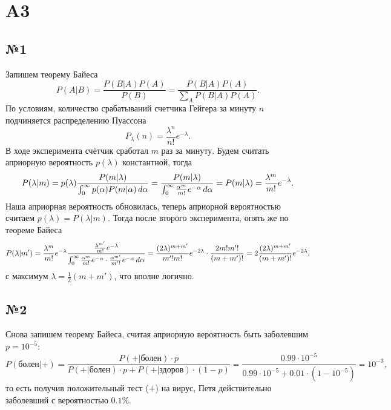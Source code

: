 \newpage

\section{A3}

\subsection*{№1}

Запишем теорему Байеса
\begin{equation*}
    P(A|B) = \frac{P(B|A) P(A)}{P(B)} = \frac{P(B|A) P(A)}{\sum_A P(B|A) P(A)}.
\end{equation*}
По условиям, количество срабатываний счетчика Гейгера за минуту $n$ подчиняется распределению Пуассона
\begin{equation*}
    P_\lambda (n) = \frac{\lambda^n}{n!} e^{-\lambda}.
\end{equation*}
В ходе эксперимента счётчик сработал $m$ раз за минуту. Будем считать априорную вероятность $p(\lambda)$ константной, тогда
\begin{equation*}
    P(\lambda|m) = p(\lambda) \frac{P(m|\lambda)}{\int_{0}^{\infty} p(\alpha) P(m|\alpha) \, d \alpha} = \frac{P(m|\lambda)}{\int_{0}^{\infty}  \frac{\alpha^m}{m!} e^{- \alpha} \, d \alpha} = P(m|\lambda) = \frac{\lambda^m}{m!} e^{- \lambda}.
\end{equation*}
Наша априорная вероятность обновилась, теперь априорной вероятностью считаем $p(\lambda) = P(\lambda|m)$. Тогда после второго эксперимента, опять же по теореме Байеса
\begin{equation*}
    P(\lambda|m') = \frac{\lambda^m}{m!} e^{- \lambda} 
    \frac{\frac{\lambda^{m'}}{m!}e^{-\lambda}}{\int_{0}^{\infty} \frac{\alpha^m}{m!} e^{-\alpha} \cdot \frac{\alpha^{m'}}{m'!} e^{-\alpha} \, d \alpha} = 
    \frac{(2 \lambda)^{m + m'}}{m'! m!} e^{- 2 \lambda} \cdot \frac{2 m! m'!}{(m+m')!} = 2 \frac{(2 \lambda)^{m+m'}}{(m+m')!} e^{- 2 \lambda},
\end{equation*}
с максимум $\lambda = \frac{1}{2} \left(m + m'\right)$, что вполне логично. 




\subsection*{№2}

Снова запишем теорему Байеса, считая априорную вероятность быть заболевшим $p = 10^{-5}$:
\begin{equation*}
    P(\text{болен}|+) = 
    \frac{P(+|\text{болен}) \cdot p}{
        P(+|\text{болен}) \cdot p
        + P(+|\text{здоров}) \cdot (1-p)
    } = \frac{0.99 \cdot 10^{-5}}{0.99 \cdot 10^{-5} + 0.01 \cdot (1-10^{-5})} = 10^{-3},
\end{equation*}
то есть получив положительный тест ($+$) на вирус, Петя действительно заболевший с вероятностью $0.1 \%$.


